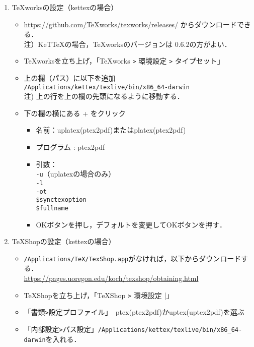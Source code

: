 \documentclass{ujarticle}
\begin{document}
\begin{enumerate}[\bf\large 1.]
\item TeXworksの設定（kettexの場合）
  \begin{itemize}
  \item \url{https://github.com/TeXworks/texworks/releases/} からダウンロードできる．\\
\hspace*{10mm}注）KeTTeXの場合，TeXworksのバージョンは 0.6.2の方がよい．
  \item TeXworksを立ち上げ，「TeXworks \verb|>| 環境設定 \verb|>| タイプセット」
  \item 上の欄（パス）に以下を追加\\
  \hspace*{5mm}\verb|/Applications/kettex/texlive/bin/x86_64-darwin|\\
  \hspace*{10mm}注) 上の行を上の欄の先頭になるように移動する．
  \item 下の欄の横にある + をクリック
    \begin{itemize}
    \item 名前：uplatex(ptex2pdf)またはplatex(ptex2pdf)
    \item プログラム : ptex2pdf
    \item 引数：\\
    \hspace*{10mm} \verb|-u|（uplatexの場合のみ）\\
    \hspace*{10mm} \verb|-l|\\
    \hspace*{10mm} \verb|-ot|\\
    \hspace*{10mm}  \verb|$synctexoption|\\
    \hspace*{10mm}  \verb|$fullname|
    \item[]OKボタンを押し，デフォルトを変更してOKボタンを押す．
    \end{itemize}
  \end{itemize}

\item TeXShopの設定（kettexの場合）
  \begin{itemize}
  \item \verb|/Applications/TeX/TexShop.app|がなければ，以下からダウンロードする．\\
  \hspace*{5mm}\url{https://pages.uoregon.edu/koch/texshop/obtaining.html}
  \item TeXShopを立ち上げ，「TeXShop \verb|>| 環境設定 |」
  \item 「書類\verb|>|設定プロファイル」　ptex(ptex2pdf)かuptex(uptex2pdf)を選ぶ
  \item 「内部設定\verb|>|パス設定」\verb|/Applications/kettex/texlive/bin/x86_64-darwin|を入れる．
  \end{itemize}


\end{enumerate}
\end{document}
